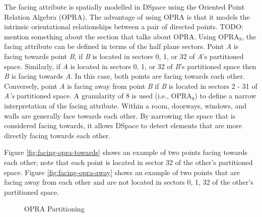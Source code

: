 \documentclass[12pt]{ucthesis}
\begin{document}
The facing attribute is spatially modelled in DSpace using the Oriented Point Relation Algebra \cite{Moratz} (OPRA). The advantage of using OPRA is that it models the intrinsic orientational relationships between a pair of directed points. TODO: mention something about the section that talks about OPRA. Using OPRA$_{8}$, the facing attribute can be defined in terms of the half plane sectors. Point \emph{A} is facing towards point \emph{B}, if \emph{B} is located in sectors 0, 1, or 32 of \emph{A}'s partitioned space. Similarly, if \emph{A} is located in sectors 0, 1, or 32 of \emph{B}'s partitioned space then \emph{B} is facing towards \emph{A}. In this case, both points are facing towards each other. Conversely, point \emph{A} is facing away from point \emph{B} if \emph{B} is located in sectors 2 - 31 of \emph{A's} partitioned space. A granularity of 8 is used (i.e., OPRA$_{8}$) to define a narrow interpretation of the facing attribute. Within a room, doorways, windows, and walls are generally face towards each other. By narrowing the space that is considered facing towards, it allows DSpace to detect elements that are more directly facing towards each other.

Figure \ref{fig:facing-opra-towards} shows an example of two points facing towards each other; note that each point is located in sector 32 of the other's partitioned space.  Figure \ref{fig:facing-opra-away} shows an example of two points that are facing away from each other and are not located in sectors 0, 1, 32 of the other's partitioned space. 

\begin{figure}[H]
 \centering
  \hspace{10 mm}
 \caption{OPRA Partitioning }
\label{opra-facing}
\end{figure}
\end{document}
